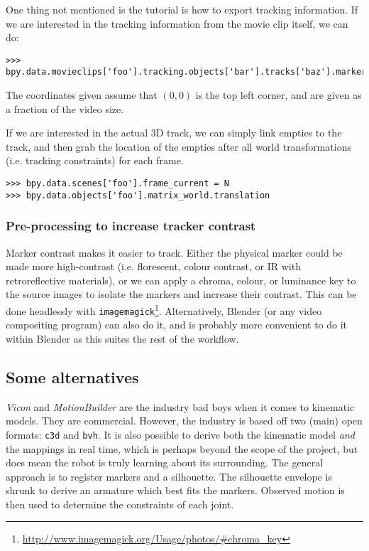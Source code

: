One thing not mentioned is the tutorial is how to export tracking information. If we are interested in the tracking information from the movie clip itself, we can do:

\begin{lstlisting}
>>> bpy.data.movieclips['foo'].tracking.objects['bar'].tracks['baz'].markers.find_frame(N).co.xy
\end{lstlisting}

The coordinates given assume that $(0, 0)$ is the top left corner, and are given as a fraction of the video size.

If we are interested in the actual 3D track, we can simply link empties to the track, and then grab the location of the empties after all world transformations (i.e. tracking constraints) for each frame.

\begin{lstlisting}
>>> bpy.data.scenes['foo'].frame_current = N
>>> bpy.data.objects['foo'].matrix_world.translation
\end{lstlisting}

\subsubsection{Pre-processing to increase tracker contrast}

Marker contrast makes it easier to track. Either the physical marker could be made more high-contrast (i.e. florescent, colour contrast, or IR with retroreflective materials), or we can apply a chroma, colour, or luminance key to the source images to isolate the markers and increase their contrast. This can be done headlessly with {\tt imagemagick}\footnote{\url{http://www.imagemagick.org/Usage/photos/\#chroma_key}}. Alternatively, Blender (or any video compositing program) can also do it, and is probably more convenient to do it within Blender as this suites the rest of the workflow.

\subsection{Some alternatives}

\emph{Vicon} and \emph{MotionBuilder} are the industry bad boys when it comes to kinematic models. They are commercial. However, the industry is based off two (main) open formats: {\tt c3d} and {\tt bvh}. It is also possible to derive both the kinematic model \emph{and} the mappings in real time, which is perhaps beyond the scope of the project, but does mean the robot is truly learning about its surrounding. The general approach is to register markers and a silhouette. The silhouette envelope is shrunk to derive an armature which best fits the markers. Observed motion is then used to determine the constraints of each joint.
